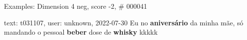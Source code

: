 \begin{frame}{Examples: Dimension 4 neg, score -2, \# 000041}
\footnotesize
\begin{alertblock}{text: t031107, user: unknown, 2022-07-30}
Eu no \textbf{aniversário} da minha mãe, só mandando o pessoal \textbf{beber} 
dose de \textbf{whisky} kkkkk 
\end{alertblock}
\end{frame}
